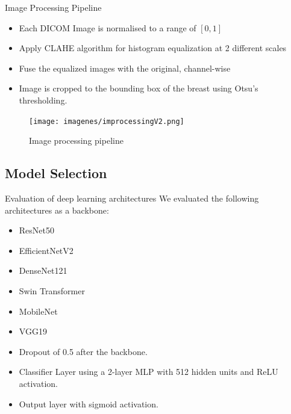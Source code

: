 \begin{frame}{Image Processing Pipeline}
    \begin{itemize}
        \item Each DICOM Image is normalised to a range of $[0, 1]$
        \item Apply CLAHE algorithm  for histogram equalization at 2 different scales
        \item Fuse the equalized images with the original, channel-wise
        \item Image is cropped to the bounding box of the breast using Otsu's thresholding.
    \end{itemize}
\end{frame}

\begin{frame}[plain]
    \begin{figure}
        \centering
        \texttt{[image: imagenes/improcessingV2.png]}
        \caption{Image processing pipeline}
    \end{figure}
\end{frame}
\subsection{Model Selection}
\begin{frame}{Evaluation of deep learning architectures}
    We evaluated the following architectures as a backbone:
    \begin{itemize}
        \item ResNet50 \cite{heDeepResidualLearning2015}
        \item EfficientNetV2 \cite{tanEfficientNetV2SmallerModels2021}
        \item DenseNet121 \cite{huangDenselyConnectedConvolutional2018}
        \item Swin Transformer \cite{liuSwinTransformerHierarchical2021}
        \item MobileNet \cite{howardMobileNetsEfficientConvolutional2017}
        \item VGG19 \cite{simonyanVeryDeepConvolutional2015}
    \end{itemize}

    \begin{itemize}
        \item Dropout of \num{0.5} after the backbone.
        \item Classifier Layer using a 2-layer MLP with \num{512} hidden units and ReLU activation.
        \item Output layer with sigmoid activation.
    \end{itemize}
    
\end{frame}

